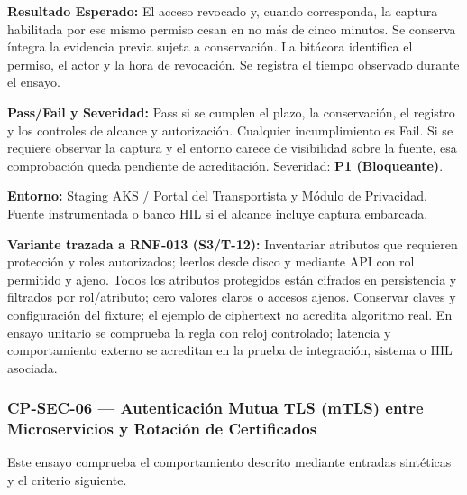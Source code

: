 \par\noindent\textbf{Resultado Esperado:} El acceso revocado y, cuando corresponda, la captura habilitada por ese mismo permiso cesan en no más de cinco minutos. Se conserva íntegra la evidencia previa sujeta a conservación. La bitácora identifica el permiso, el actor y la hora de revocación. Se registra el tiempo observado durante el ensayo.\par
\par\noindent\textbf{Pass/Fail y Severidad:} Pass si se cumplen el plazo, la conservación, el registro y los controles de alcance y autorización. Cualquier incumplimiento es Fail. Si se requiere observar la captura y el entorno carece de visibilidad sobre la fuente, esa comprobación queda pendiente de acreditación. Severidad: \textbf{P1 (Bloqueante)}.\par
\par\noindent\textbf{Entorno:} Staging AKS / Portal del Transportista y Módulo de Privacidad. Fuente instrumentada o banco HIL si el alcance incluye captura embarcada.\par

\par\noindent\textbf{Variante trazada a RNF-013 (S3/T-12):} Inventariar atributos que requieren protección y roles autorizados; leerlos desde disco y mediante API con rol permitido y ajeno. Todos los atributos protegidos están cifrados en persistencia y filtrados por rol/atributo; cero valores claros o accesos ajenos. Conservar claves y configuración del fixture; el ejemplo de ciphertext no acredita algoritmo real. En ensayo unitario se comprueba la regla con reloj controlado; latencia y comportamiento externo se acreditan en la prueba de integración, sistema o HIL asociada.\par
\subsubsection*{CP-SEC-06 — Autenticación Mutua TLS (mTLS) entre Microservicios y Rotación de Certificados}\label{sec:9-cp-sec-06}
Este ensayo comprueba el comportamiento descrito mediante entradas sintéticas y el criterio siguiente.


